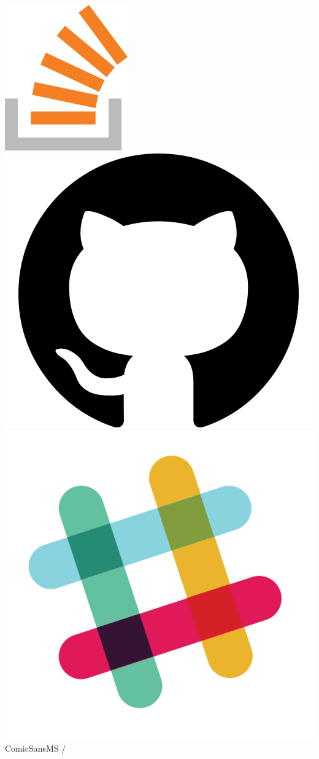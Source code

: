 \documentclass[aspectratio=169]{beamer}
\begin{document}
\begin{frame}
  \href{https://stackoverflow.com/users/577603/comicsansms}{\includegraphics[height=.05\textheight]{resources/so-icon.png}}
  \href{https://github.com/ComicSansMS}{\includegraphics[height=.05\textheight]{resources/github-icon.png}}
  \includegraphics[height=.05\textheight]{resources/slack-icon.png} ComicSansMS /

\end{frame}
\end{document}
